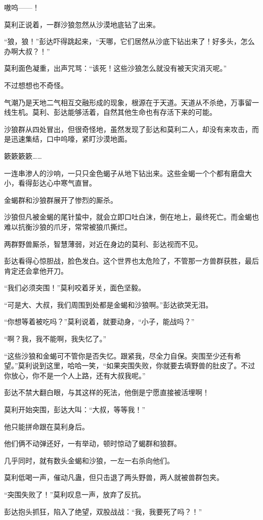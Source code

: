 \begin{this_body}
嗷呜——！

莫利正说着，一群沙狼忽然从沙漠地底钻了出来。

“狼，狼！”彭达吓得跳起来，“天哪，它们居然从沙底下钻出来了！好多头，怎么办啊大叔？！”

莫利面色凝重，出声咒骂：“该死！这些沙狼怎么就没有被天灾消灭呢。”

不过想想也不奇怪。

气潮乃是天地二气相互交融形成的现象，根源在于天道。天道从不杀绝，万事留一线生机。莫利、彭达能够活着，自然其他生命也有存活下来的可能。

沙狼群从四处冒出，但很奇怪地，虽然发现了彭达和莫利二人，却没有来攻击，而是迅速集结，口中呜嚎，紧盯沙漠地面。

簌簌簌簌……

一连串渗人的沙响，一只只金色蝎子从地下钻出来。这些金蝎一个个都有磨盘大小，看得彭达心中寒气直冒。

金蝎群和沙狼群展开了惨烈的厮杀。

沙狼但凡被金蝎的尾针蛰中，就会立即口吐白沫，倒在地上，最终死亡。而金蝎也难以抗衡沙狼的爪牙，常常被狼爪撕烂。

两群野兽厮杀，智慧薄弱，对近在身边的莫利、彭达视而不见。

彭达看得心惊胆战，脸色发白。这个世界也太危险了，不管那一方兽群获胜，最后肯定还会拿他开刀。

“我们必须突围！”莫利咬着牙关，面色坚毅。

“可是大、大叔，我们周围到处都是金蝎和沙狼啊。”彭达欲哭无泪。

“你想等着被吃吗？”莫利说着，就要动身，“小子，能战吗？”

“啊？我，我不能啊，我失忆了。”

“这些沙狼和金蝎可不管你是否失忆。跟紧我，尽全力自保。突围至少还有希望。”莫利说到这里，哈哈一笑，“如果突围失败，你就要去填野兽的肚皮了。不过你放心，你不是一个人上路，还有大叔我呢。”

彭达不禁大翻白眼，与其这样的死法，他倒是宁愿直接被活埋啊！

莫利开始突围，彭达大叫：“大叔，等等我！”

他只能拼命跟在莫利身后。

他们俩不动弹还好，一有举动，顿时惊动了蝎群和狼群。

几乎同时，就有数头金蝎和沙狼，一左一右杀向他们。

莫利低喝一声，催动凡蛊，但只击退了两头野兽，两人就被兽群包夹。

“突围失败了！”莫利叹息一声，放弃了反抗。

彭达抱头抓狂，陷入了绝望，双股战战：“我，我要死了吗？！”


\end{this_body}
